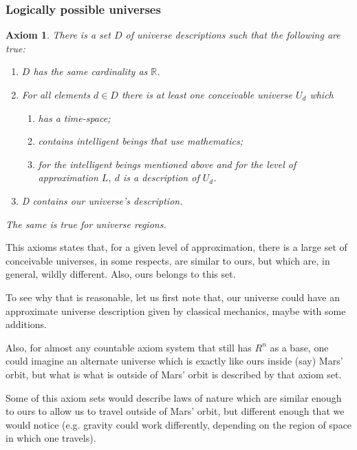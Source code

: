 \documentclass[a4paper
,draft
]{article}
\def\reale{\mathbb{R}}
\newtheorem{axiom}{Axiom}
\begin{document}
\subsubsection{Logically possible universes}

\begin{axiom}\label{uncountable}
  There is a set $D$ of universe descriptions such that the following are true:
  \begin{enumerate}
    \item $D$ has the same cardinality as $\reale$.
    \item For all elements $d\in D$ there is at least one conceivable
          universe $U_d$ which
      \begin{enumerate}
        \item has a time-space;
        \item contains intelligent beings that use mathematics;
        \item for the intelligent beings mentioned above and
              for the level of approximation $L$,
              $d$ is a description of $U_d$.
      \end{enumerate}
    \item D contains our universe's description.
  \end{enumerate}
  The same is true for universe regions.
\end{axiom}

This axioms states that, for a given level of approximation,
there is a large set of conceivable universes, in some respects,
are similar to ours, but which are, in general, wildly different.
Also, ours belongs to this set.

To see why that is reasonable, let us first note that,
our universe could have an approximate universe description
given by classical mechanics, maybe with some additions.

Also, for almost any countable axiom system that still
has $R^n$ as a base, one could imagine an alternate universe
which is exactly like ours inside (say) Mars' orbit,
but what is what is outside of Mars' orbit is described by that axiom set.

Some of this axiom sets would describe laws of nature which are similar enough
to ours to allow us to travel outside of Mars' orbit, but different enough that
we would notice (e.g. gravity could work differently, depending on the region
of space in which one travels).
\end{document}
